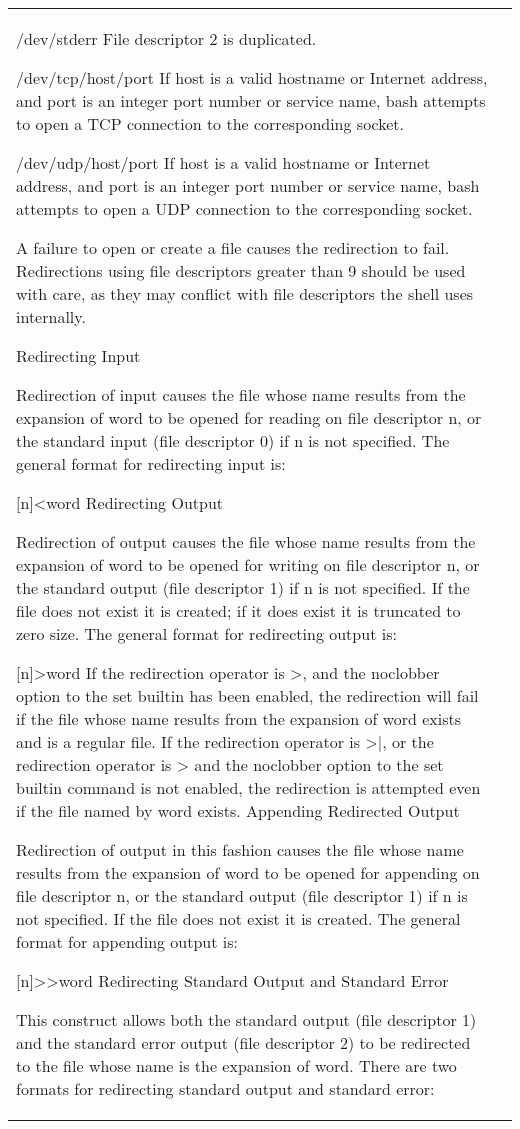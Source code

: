 \documentclass[11pt]{article}
\begin{document}
\begin{longtable}{p{}p{}}
{{{/dev/stderr
File descriptor 2 is duplicated.

/dev/tcp/host/port
If host is a valid hostname or Internet address, and port is an integer port number or service name, bash attempts to open a TCP connection to the corresponding socket.

/dev/udp/host/port
If host is a valid hostname or Internet address, and port is an integer port number or service name, bash attempts to open a UDP connection to the corresponding socket.

A failure to open or create a file causes the redirection to fail.
Redirections using file descriptors greater than 9 should be used with care, as they may conflict with file descriptors the shell uses internally.

Redirecting Input

Redirection of input causes the file whose name results from the expansion of word to be opened for reading on file descriptor n, or the standard input (file descriptor 0) if n is not specified.
The general format for redirecting input is:

[n]<word
Redirecting Output

Redirection of output causes the file whose name results from the expansion of word to be opened for writing on file descriptor n, or the standard output (file descriptor 1) if n is not specified. If the file does not exist it is created; if it does exist it is truncated to zero size.
The general format for redirecting output is:

[n]>word
If the redirection operator is >, and the noclobber option to the set builtin has been enabled, the redirection will fail if the file whose name results from the expansion of word exists and is a regular file. If the redirection operator is >|, or the redirection operator is > and the noclobber option to the set builtin command is not enabled, the redirection is attempted even if the file named by word exists.
Appending Redirected Output

Redirection of output in this fashion causes the file whose name results from the expansion of word to be opened for appending on file descriptor n, or the standard output (file descriptor 1) if n is not specified. If the file does not exist it is created.
The general format for appending output is:

[n]>>word
Redirecting Standard Output and Standard Error

This construct allows both the standard output (file descriptor 1) and the standard error output (file descriptor 2) to be redirected to the file whose name is the expansion of word.
There are two formats for redirecting standard output and standard error:

}}}
\end{longtable}
\end{document}
